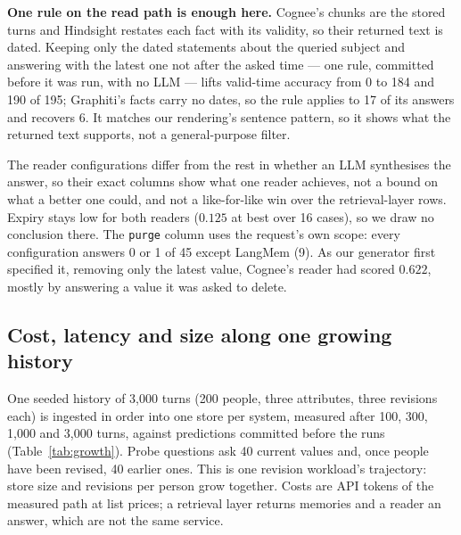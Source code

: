 \documentclass[conference]{IEEEtran}
\begin{document}
\textbf{One rule on the read path is enough here.} Cognee's chunks are the
stored turns and Hindsight restates each fact with its validity, so their
returned text is dated. Keeping only the dated statements about the queried
subject and answering with the latest one not after the asked time --- one rule,
committed before it was run, with no LLM --- lifts valid-time accuracy from 0 to
184 and 190 of 195; Graphiti's facts carry no dates, so the rule applies to 17
of its answers and recovers 6. It matches our rendering's sentence pattern, so
it shows what the returned text supports, not a general-purpose filter.

The reader configurations differ from the rest in whether an LLM synthesises the
answer, so their exact columns show what one reader achieves, not a bound on what
a better one could, and not a like-for-like win over the retrieval-layer rows. Expiry stays low
for both readers ($0.125$ at best over 16 cases), so we draw no conclusion there.
The \texttt{purge} column uses the request's own scope: every configuration
answers 0 or 1 of 45 except LangMem (9). As our generator first specified it,
removing only the latest value, Cognee's reader had scored $0.622$, mostly by
answering a value it was asked to delete.

\subsection{Cost, latency and size along one growing history}\label{sec:cost}

One seeded history of 3{,}000 turns (200 people, three attributes, three
revisions each) is ingested in order into one store per system, measured after
100, 300, 1{,}000 and 3{,}000 turns, against predictions committed before the
runs (Table~\ref{tab:growth}). Probe questions ask 40 current values and, once
people have been revised, 40 earlier ones. This is one revision workload's
trajectory: store size and revisions per person grow together. Costs are API
tokens of the measured path at list prices; a retrieval layer returns memories
and a reader an answer, which are not the same service.
\end{document}
